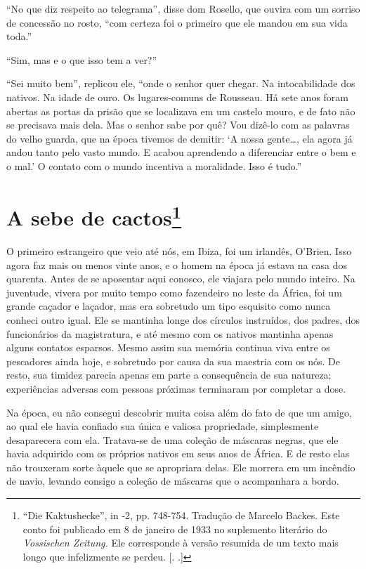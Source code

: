 ``No que diz respeito ao telegrama'', disse dom Rosello, que ouvira com
um sorriso de concessão no rosto, ``com certeza foi o primeiro que ele
mandou em sua vida toda.''

``Sim, mas e o que isso tem a ver?''

``Sei muito bem'', replicou ele, ``onde o senhor quer chegar. Na
intocabilidade dos nativos. Na idade de ouro. Os lugares-comuns de
Rousseau. Há sete anos foram abertas as portas da prisão que se
localizava em um castelo mouro, e de fato não se precisava mais dela.
Mas o senhor sabe por quê? Vou dizê-lo com as palavras do velho guarda,
que na época tivemos de demitir: `A nossa gente\ldots{}, ela agora já
andou tanto pelo vasto mundo. E acabou aprendendo a diferenciar entre o
bem e o mal.' O contato com o mundo incentiva a moralidade. Isso é
tudo.''

\chapter{A sebe de cactos\footnote[*]{``Die Kaktushecke'', in  -2, pp. 748-754.
  Tradução de Marcelo Backes. Este conto foi publicado em 8 de janeiro
  de 1933 no suplemento literário do \emph{Vossischen Zeitung.} Ele
  corresponde à versão resumida de um texto mais longo que infelizmente
  se perdeu. [. .]} }

O primeiro estrangeiro que veio até nós, em Ibiza, foi um irlandês,
O'Brien. Isso agora faz mais ou menos vinte anos, e o homem na época já
estava na casa dos quarenta. Antes de se aposentar aqui conosco, ele
viajara pelo mundo inteiro. Na juventude, vivera por muito tempo como
fazendeiro no leste da África, foi um grande caçador e laçador, mas era
sobretudo um tipo esquisito como nunca conheci outro igual. Ele se
mantinha longe dos círculos instruídos, dos padres, dos funcionários da
magistratura, e até mesmo com os nativos mantinha apenas alguns contatos
esparsos. Mesmo assim sua memória continua viva entre os pescadores
ainda hoje, e sobretudo por causa da sua maestria com os nós. De resto,
sua timidez parecia apenas em parte a consequência de sua natureza;
experiências adversas com pessoas próximas terminaram por completar a
dose.

Na época, eu não consegui descobrir muita coisa além do fato de que um
amigo, ao qual ele havia confiado sua única e valiosa propriedade,
simplesmente desaparecera com ela. Tratava-se de uma coleção de máscaras
negras, que ele havia adquirido com os próprios nativos em seus anos de
África. E de resto elas não trouxeram sorte àquele que se apropriara
delas. Ele morrera em um incêndio de navio, levando consigo a coleção de
máscaras que o acompanhara a bordo.


